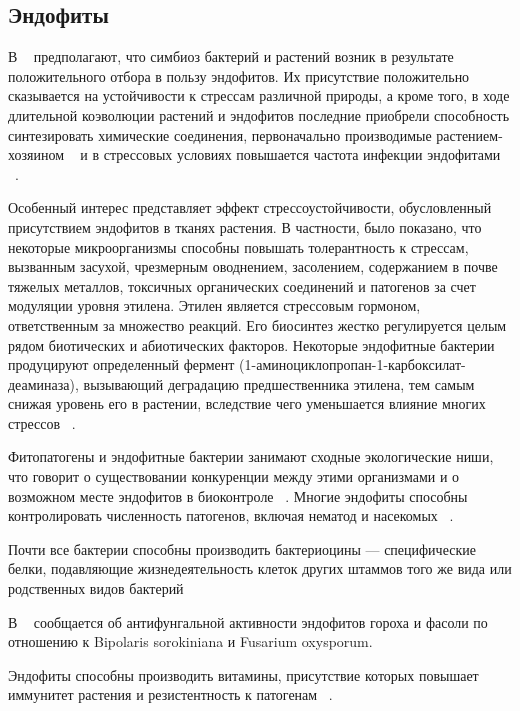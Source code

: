 \documentclass[11pt]{article}
\begin{document}
	\subsection{Эндофиты}
	В ~\cite{j.tree.2006.11.007} предполагают, что симбиоз бактерий и растений возник в результате положительного отбора в пользу эндофитов.  Их присутствие положительно сказывается на устойчивости к стрессам различной природы, а кроме того, в ходе длительной коэволюции растений и эндофитов последние приобрели способность синтезировать химические соединения, первоначально производимые растением-хозяином ~\cite{j.micres.2015.11.008, S1286-4579(03)00073-X} и в стрессовых условиях повышается частота инфекции эндофитами ~\cite{b609472b}.
	
	Особенный интерес представляет эффект стрессоустойчивости, обусловленный присутствием эндофитов в тканях растения. В частности, было показано, что некоторые микроорганизмы способны повышать толерантность к стрессам, вызванным засухой, чрезмерным оводнением, засолением, содержанием в почве тяжелых металлов, токсичных органических соединений и патогенов за счет модуляции уровня этилена. Этилен является стрессовым гормоном, ответственным за множество реакций. Его биосинтез жестко регулируется целым рядом биотических и абиотических факторов. Некоторые эндофитные бактерии продуцируют определенный фермент (1-аминоциклопропан-1-карбоксилат-деаминаза), вызывающий деградацию предшественника этилена, тем самым снижая уровень его в растении, вследствие чего уменьшается влияние многих стрессов ~\cite{ecogen17119-32,22115501113026660038}.
	
	Фитопатогены и эндофитные бактерии занимают сходные экологические ниши, что говорит о существовании конкуренции между этими организмами и о возможном месте эндофитов в биоконтроле ~\cite{j.femsec.2004.08.006}. Многие эндофиты способны контролировать численность патогенов, включая нематод и насекомых ~\cite{ecogen17119-32,22115501113026660038, vol3-issue1-fulltext-4, j.1574-6968.2007.00918.x}.
	
	Почти все бактерии способны производить бактериоцины — специфические белки, подавляющие жизнедеятельность клеток других штаммов того же вида или родственных видов бактерий ~\cite{annurev.micro.56.012302.161024}
	
	В ~\cite{IPLA_2010_11} сообщается об антифунгальной активности эндофитов гороха и фасоли по отношению к Bipolaris sorokiniana и Fusarium oxysporum.
	
	Эндофиты способны производить витамины, присутствие которых повышает иммунитет растения и резистентность к патогенам ~\cite{j.1574-6968.2007.00918.x, s0168-1656(01)00333-9, MPMI-7-0440 ,j.0031-9317.2004.00330.x}.
	 
\end{document}
